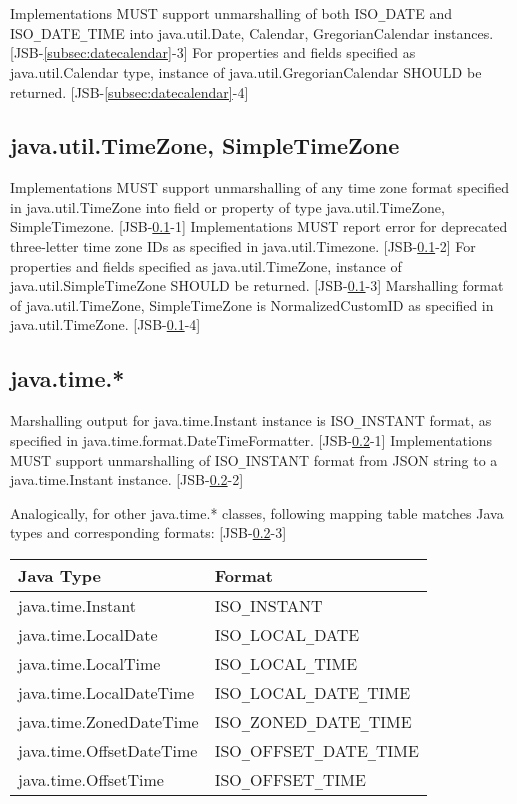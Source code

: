 Implementations MUST support unmarshalling of both ISO\verb|_|DATE and ISO\verb|_|DATE\verb|_|TIME into java.util.Date, Calendar, GregorianCalendar instances. [JSB-\ref{subsec:datecalendar}-3] For properties and fields specified as java.util.Calendar type, instance of java.util.GregorianCalendar SHOULD be returned. [JSB-\ref{subsec:datecalendar}-4]

\subsection{java.util.TimeZone, SimpleTimeZone}
\label{subsec:dateTimezone}

Implementations MUST support unmarshalling of any time zone format specified in java.util.TimeZone into field or property of type java.util.TimeZone, SimpleTimezone. [JSB-\ref{subsec:dateTimezone}-1] Implementations MUST report error for deprecated three-letter time zone IDs as specified in java.util.Timezone. [JSB-\ref{subsec:dateTimezone}-2] For properties and fields specified as java.util.TimeZone, instance of java.util.SimpleTimeZone SHOULD be returned. [JSB-\ref{subsec:dateTimezone}-3]
Marshalling format of java.util.TimeZone, SimpleTimeZone is NormalizedCustomID as specified in java.util.TimeZone. [JSB-\ref{subsec:dateTimezone}-4]

\subsection{java.time.*}
\label{subsec:time}

Marshalling output for java.time.Instant instance is ISO\verb|_|INSTANT format, as specified in java.time.format.DateTimeFormatter. [JSB-\ref{subsec:time}-1]
Implementations MUST support unmarshalling of ISO\verb|_|INSTANT format from JSON string to a java.time.Instant instance. [JSB-\ref{subsec:time}-2]

Analogically, for other java.time.* classes, following mapping table matches Java types and corresponding formats: [JSB-\ref{subsec:time}-3]

\begin{tabularx}{\textwidth}{ |X|X| }
\hline
Java Type & Format \\ 
\hline
java.time.Instant & ISO\verb|_|INSTANT\\
java.time.LocalDate & ISO\verb|_|LOCAL\verb|_|DATE\\
java.time.LocalTime & ISO\verb|_|LOCAL\verb|_|TIME\\
java.time.LocalDateTime & ISO\verb|_|LOCAL\verb|_|DATE\verb|_|TIME\\
java.time.ZonedDateTime & ISO\verb|_|ZONED\verb|_|DATE\verb|_|TIME\\
java.time.OffsetDateTime & ISO\verb|_|OFFSET\verb|_|DATE\verb|_|TIME\\
java.time.OffsetTime & ISO\verb|_|OFFSET\verb|_|TIME\\
\hline
\end{tabularx}

